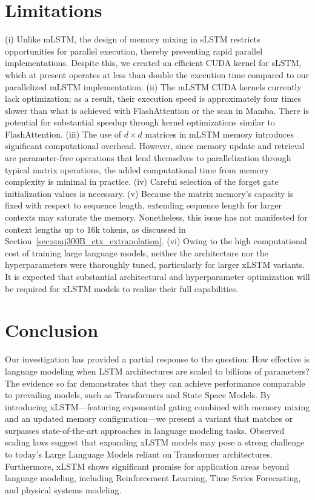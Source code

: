 \section{Limitations}

(i) Unlike mLSTM, the design of memory mixing in sLSTM restricts opportunities for parallel execution, thereby preventing rapid parallel implementations. Despite this, we created an efficient CUDA kernel for sLSTM, which at present operates at less than double the execution time compared to our parallelized mLSTM implementation. (ii) The mLSTM CUDA kernels currently lack optimization; as a result, their execution speed is approximately four times slower than what is achieved with FlashAttention or the scan in Mamba. There is potential for substantial speedup through kernel optimizations similar to FlashAttention. (iii) The use of $d \times d$ matrices in mLSTM memory introduces significant computational overhead. However, since memory update and retrieval are parameter-free operations that lend themselves to parallelization through typical matrix operations, the added computational time from memory complexity is minimal in practice. (iv) Careful selection of the forget gate initialization values is necessary. (v) Because the matrix memory’s capacity is fixed with respect to sequence length, extending sequence length for larger contexts may saturate the memory. Nonetheless, this issue has not manifested for context lengths up to 16k tokens, as discussed in Section~\ref{sec:spaj300B_ctx_extrapolation}. (vi) Owing to the high computational cost of training large language models, neither the architecture nor the hyperparameters were thoroughly tuned, particularly for larger xLSTM variants. It is expected that substantial architectural and hyperparameter optimization will be required for xLSTM models to realize their full capabilities.

\section{Conclusion}
Our investigation has provided a partial response to the question: How effective is language modeling when LSTM architectures are scaled to billions of parameters? The evidence so far demonstrates that they can achieve performance comparable to prevailing models, such as Transformers and State Space Models. By introducing xLSTM—featuring exponential gating combined with memory mixing and an updated memory configuration—we present a variant that matches or surpasses state-of-the-art approaches in language modeling tasks. Observed scaling laws suggest that expanding xLSTM models may pose a strong challenge to today’s Large Language Models reliant on Transformer architectures. Furthermore, xLSTM shows significant promise for application areas beyond language modeling, including Reinforcement Learning, Time Series Forecasting, and physical systems modeling.

